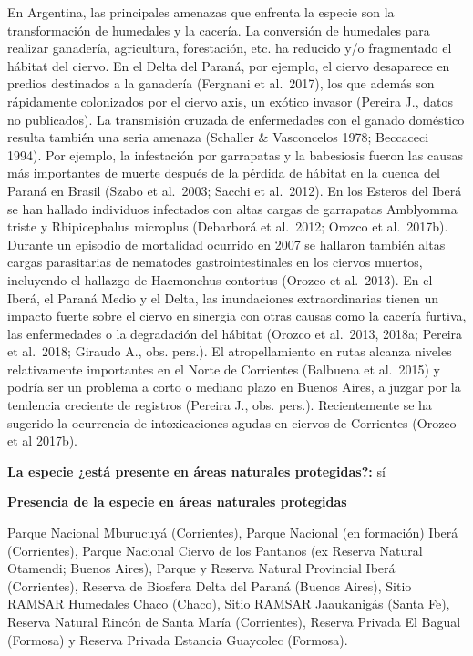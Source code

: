 \documentclass[
  x11names]{article}
\begin{document}
En Argentina, las principales amenazas que enfrenta la especie son la
transformación de humedales y la cacería. La conversión de humedales
para realizar ganadería, agricultura, forestación, etc. ha reducido y/o
fragmentado el hábitat del ciervo. En el Delta del Paraná, por ejemplo,
el ciervo desaparece en predios destinados a la ganadería (Fergnani et
al.~2017), los que además son rápidamente colonizados por el ciervo
axis, un exótico invasor (Pereira J., datos no publicados). La
transmisión cruzada de enfermedades con el ganado doméstico resulta
también una seria amenaza (Schaller \& Vasconcelos 1978; Beccaceci
1994). Por ejemplo, la infestación por garrapatas y la babesiosis fueron
las causas más importantes de muerte después de la pérdida de hábitat en
la cuenca del Paraná en Brasil (Szabo et al.~2003; Sacchi et al.~2012).
En los Esteros del Iberá se han hallado individuos infectados con altas
cargas de garrapatas Amblyomma triste y Rhipicephalus microplus
(Debarborá et al.~2012; Orozco et al.~2017b). Durante un episodio de
mortalidad ocurrido en 2007 se hallaron también altas cargas
parasitarias de nematodes gastrointestinales en los ciervos muertos,
incluyendo el hallazgo de Haemonchus contortus (Orozco et al.~2013). En
el Iberá, el Paraná Medio y el Delta, las inundaciones extraordinarias
tienen un impacto fuerte sobre el ciervo en sinergia con otras causas
como la cacería furtiva, las enfermedades o la degradación del hábitat
(Orozco et al.~2013, 2018a; Pereira et al.~2018; Giraudo A., obs.
pers.). El atropellamiento en rutas alcanza niveles relativamente
importantes en el Norte de Corrientes (Balbuena et al.~2015) y podría
ser un problema a corto o mediano plazo en Buenos Aires, a juzgar por la
tendencia creciente de registros (Pereira J., obs. pers.). Recientemente
se ha sugerido la ocurrencia de intoxicaciones agudas en ciervos de
Corrientes (Orozco et al 2017b).

\textbf{La especie ¿está presente en áreas naturales protegidas?:} sí

\textbf{Presencia de la especie en áreas naturales protegidas}

Parque Nacional Mburucuyá (Corrientes), Parque Nacional (en formación)
Iberá (Corrientes), Parque Nacional Ciervo de los Pantanos (ex Reserva
Natural Otamendi; Buenos Aires), Parque y Reserva Natural Provincial
Iberá (Corrientes), Reserva de Biosfera Delta del Paraná (Buenos Aires),
Sitio RAMSAR Humedales Chaco (Chaco), Sitio RAMSAR Jaaukanigás (Santa
Fe), Reserva Natural Rincón de Santa María (Corrientes), Reserva Privada
El Bagual (Formosa) y Reserva Privada Estancia Guaycolec (Formosa).
\end{document}

